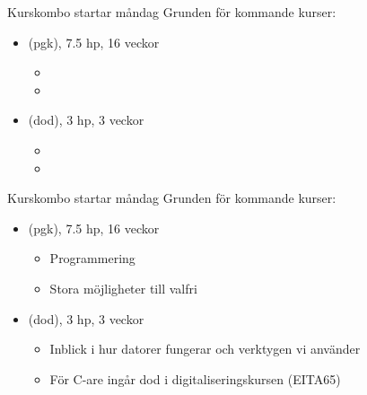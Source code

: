 \documentclass{lecturesimple}
\newcommand{\Startdag}{måndag}
\begin{document}
\begin{Slide}{Kurskombo startar \Startdag}
  Grunden för kommande kurser: \vspace{2em}
  \begin{itemize}
    \item {} (pgk), 7.5 hp, 16 veckor
    \begin{itemize}
      \item[]
      \item[]
    \end{itemize}
    \item {} (dod), 3 hp, 3 veckor
    \begin{itemize}
      \item[] 
      \item[] 
    \end{itemize}
  \end{itemize}
\end{Slide}

\begin{Slide}{Kurskombo startar \Startdag}
  Grunden för kommande kurser: \vspace{2em}
  \begin{itemize}
    \item {} (pgk), 7.5 hp, 16 veckor
    \begin{itemize}
      \item Programmering 
      \item Stora möjligheter till valfri 
    \end{itemize}
    \item {} (dod), 3 hp, 3 veckor
    \begin{itemize}
      \item Inblick i hur datorer fungerar och verktygen vi använder
      \item För C-are ingår dod i digitaliseringskursen (EITA65)
    \end{itemize}
  \end{itemize}
\end{Slide}
\end{document}
